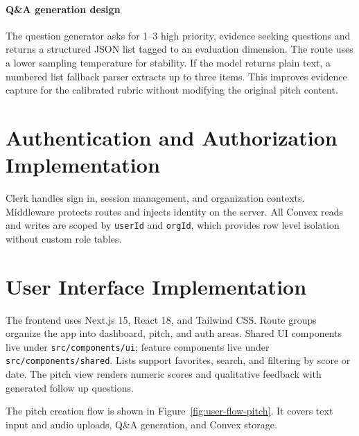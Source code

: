 \paragraph{Q\&A generation design} The question generator asks for 1--3 high priority, evidence seeking questions and returns a structured JSON list tagged to an evaluation dimension. The route uses a lower sampling temperature for stability. If the model returns plain text, a numbered list fallback parser extracts up to three items. This improves evidence capture for the calibrated rubric without modifying the original pitch content.

\section{Authentication and Authorization Implementation}
Clerk handles sign in, session management, and organization contexts. Middleware protects routes and injects identity on the server. All Convex reads and writes are scoped by \texttt{userId} and \texttt{orgId}, which provides row level isolation without custom role tables.

\section{User Interface Implementation}
The frontend uses Next.js 15, React 18, and Tailwind CSS. Route groups organize the app into dashboard, pitch, and auth areas. Shared UI components live under \texttt{src/components/ui}; feature components live under \texttt{src/components/shared}. Lists support favorites, search, and filtering by score or date. The pitch view renders numeric scores and qualitative feedback with generated follow up questions.

The pitch creation flow is shown in Figure~\ref{fig:user-flow-pitch}. It covers text input and audio uploads, Q\&A generation, and Convex storage.

